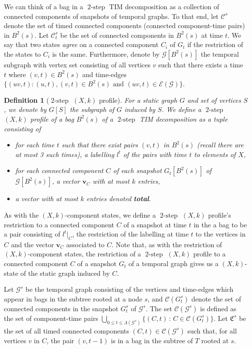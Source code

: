 \documentclass[a4paper,UKenglish,cleveref, autoref, thm-restate]{lipics-v2021} %
\DeclareMathOperator{\twostep}{2-step}
\newcounter{ctheorem}
\newtheorem{defn}[ctheorem]{Definition}
\begin{document}
\begin{toappendix}
We can think of a bag in a $\twostep$ TIM decomposition as a collection of connected components of snapshots of temporal graphs. To that end, let $\mathcal{C}^{s}$ denote the set of timed connected components (connected component-time pairs) in $B^2(s)$. Let $\mathcal{C}^s_t$ be the set of connected components in $B^2(s)$ at time $t$. We say that two states \emph{agree} on a connected component $C_i$ of $G_t$ if the restriction of the states to $C_i$ is the same.  Furthermore, denote by $\mathcal{G}[B^2(s)]$ the temporal subgraph with vertex set consisting of all vertices $v$ such that there exists a time $t$ where $(v,t)\in B^2(s)$ and time-edges $\{(uv,t):(u,t),(v,t)\in B^2(s) \text{ and } (uv,t)\in\mathcal{E}(\mathcal{G})\}$. 

\begin{defn}[$\twostep$ $(X,k)$ profile]
    For a static graph $G$ and set of vertices $S$, we denote by $G[S]$ the subgraph of $G$ induced by $S$. We define a $\twostep$ $(X,k)$ \emph{profile} of a bag $B^2(s)$ of a $\twostep$ TIM decomposition as a tuple consisting of
\begin{itemize}
    \item for each time $t$ such that there exist pairs $(v,t)$ in $B^2(s)$ (recall there are at most 3 such times), a labelling $l^t$ of the pairs with time $t$ to elements of $X$,
    \item for each connected component $C$ of each snapshot $G_t[B^2(s)]$ of $\mathcal{G}[B^2(s)]$, a vector $\textbf{v}_C$ with at most $k$ entries,
    \item a vector with at most $k$ entries denoted \textbf{total}.
\end{itemize}
\end{defn}

As with the $(X,k)$-component states, we define a $\twostep$ $(X,k)$ profile's restriction to a connected component $C$ of a snapshot at time $t$ in the a bag to be a pair consisting of $l^t|_C$, the restriction of the labelling at time $t$ to the vertices in $C$ and the vector $\textbf{v}_C$ associated to $C$. Note that, as with the restriction of $(X,k)$-component states, the restriction of a $\twostep$ $(X,k)$ profile to a connected component $C$ of a snapshot $G_t$ of a temporal graph gives us a $(X,k)$-state of the static graph induced by $C$. 

Let $\mathcal{G}^s$ be the temporal graph consisting of the vertices and time-edges which appear in bags in the subtree rooted at a node $s$, and $\mathcal{C}(G_t^s)$ denote the set of connected components in the snapshot $G^s_t$ of $\mathcal{G}^s$. The set $\mathcal{C}(\mathcal{G}^s)$ is defined as the set of component-time pairs $\bigcup_{0\leq t\leq \Lambda(\mathcal{G}^s)}\{(C,t) \,: \,C \in \mathcal{C}(G_t^s)\}$. Let $\mathfrak{C}^s$ be the set of all timed connected components $(C,t)\in\mathcal{C}(\mathcal{G}^s)$ such that, for all vertices $v$ in $C$, the pair $(v,t-1)$ is in a bag in the subtree of $T$ rooted at $s$.


\end{toappendix}
\end{document}
